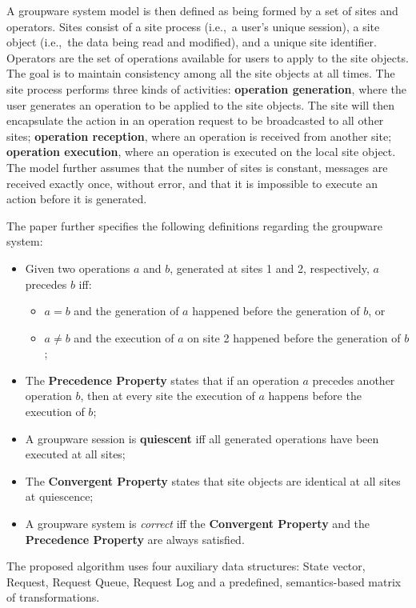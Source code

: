 A groupware system model is then defined as being formed by a set of sites and operators. Sites consist of a site process (i.e.,\ a user's unique session), a site object (i.e.,\ the data being read and modified), and a unique site identifier. Operators are the set of operations available for users to apply to the site objects. The goal is to maintain consistency among all the site objects at all times. The site process performs three kinds of activities: \textbf{operation generation}, where the user generates an operation to be applied to the site objects. The site will then encapsulate the action in an operation request to be broadcasted to all other sites; \textbf{operation reception}, where an operation is received from another site; \textbf{operation execution}, where an operation is executed on the local site object. The model further assumes that the number of sites is constant, messages are received exactly once, without error, and that it is impossible to execute an action before it is generated.

The paper further specifies the following definitions regarding the groupware system:

\begin{itemize}
    \item Given two operations $a$ and $b$, generated at sites 1 and 2, respectively, $a$ precedes $b$ iff:
    \begin{itemize}
        \item $a = b$ and the generation of $a$ happened before the generation of $b$, or
        \item $a \neq b$ and the execution of $a$ on site 2 happened before the generation of $b$;
    \end{itemize}
    \item The \textbf{Precedence Property} states that if an operation $a$ precedes another operation $b$, then at every site the execution of $a$ happens before the execution of $b$;
    \item A groupware session is \textbf{quiescent} iff all generated operations have been executed at all sites;
    \item The \textbf{Convergent Property} states that site objects are identical at all sites at quiescence;
    \item A groupware system is \textit{correct} iff the \textbf{Convergent Property} and the \textbf{Precedence Property} are always satisfied.
\end{itemize}

The proposed algorithm uses four auxiliary data structures: State vector, Request, Request Queue, Request Log and a predefined, semantics-based matrix of transformations. 


